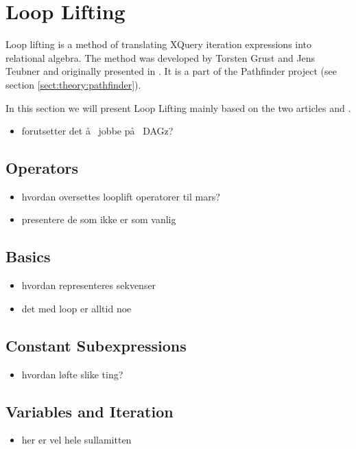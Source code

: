 \section{Loop Lifting}
\label{sect:translation:loop_lifting}
Loop lifting is a method of translating XQuery iteration expressions into relational algebra. The method was
developed by Torsten Grust and Jens Teubner and originally presented in \cite{pathfinder_mothertongue}. It is a
part of the Pathfinder project\cite{pathfinderHome} (see section \ref{sect:theory:pathfinder}).

In this section we will present Loop Lifting mainly based on the two articles \cite{pathfinder_mothertongue} and
\cite{pathfinder_purelyRelational}.

\begin{itemize}
  \item forutsetter det \aa~ jobbe p\aa~ DAGz?
\end{itemize}

\subsection{Operators}
\label{sect:translation:llOperators}
\begin{itemize}
  \item hvordan oversettes looplift operatorer til mars?
  \item presentere de som ikke er som vanlig
\end{itemize}


\subsection{Basics}
\label{sect:translation:llBasics}
\begin{itemize}
  \item hvordan representeres sekvenser
  \item det med loop er alltid noe
\end{itemize}

\subsection{Constant Subexpressions}
\label{sect:translation:llConstExprs}
\begin{itemize}
  \item hvordan l\o fte slike ting?
\end{itemize}

\subsection{Variables and Iteration}
\label{sect:translation:llIteration}
\begin{itemize}
  \item her er vel hele sullamitten
\end{itemize}


